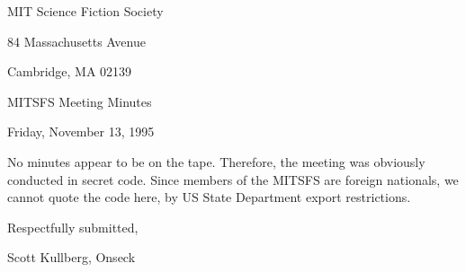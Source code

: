 \documentclass[12pt]{article}
\begin{document}
\begin{center}

MIT Science Fiction Society 

84 Massachusetts Avenue

Cambridge, MA 02139

\vspace{12pt}

MITSFS Meeting Minutes 

Friday, November 13, 1995

\end{center}
 
\vspace{18pt}

\setlength{\parskip}{6pt}

\noindent
No minutes appear to be on the tape. Therefore, the meeting was obviously conducted in secret code. Since members of the MITSFS are foreign nationals, we cannot quote the code here, by US State Department export restrictions.

\vspace{18pt}

\centerline{Respectfully submitted,}
\centerline{Scott Kullberg, Onseck}
\end{document}
